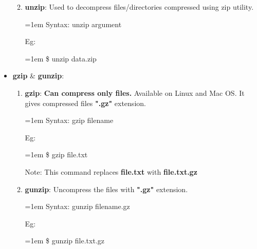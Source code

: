 \begin{flushleft}
\begin{itemize}
\begin{enumerate}
\begin{itemize}
			\end{itemize}
			
			\bigskip\bigskip
			\item \textbf{unzip}: Used to decompress files/directories compressed using zip utility.
			\begin{tcolorbox}[breakable,notitle,boxrule=0pt,colback=pink,colframe=pink]
				\color{black}
				\fontdimen2\font=1em
				Syntax: unzip argument
				\fontdimen2\font=4pt
			\end{tcolorbox}
			Eg:
			\begin{tcolorbox}[breakable,notitle,boxrule=-0pt,colback=black,colframe=black]
				\color{green}
				\fontdimen2\font=1em
				\$ unzip data.zip
				\fontdimen2\font=4pt
			\end{tcolorbox}
			
		\end{enumerate}
	

		\item \textbf{gzip} \& \textbf{gunzip}:
		\begin{enumerate}
			\item \textbf{gzip}: \textbf{Can compress only files.} Available on Linux and Mac OS. It gives compressed files \textbf{".gz"} extension.
			\begin{tcolorbox}[breakable,notitle,boxrule=0pt,colback=pink,colframe=pink]
				\color{black}
				\fontdimen2\font=1em
				Syntax: gzip filename
				\fontdimen2\font=4pt
			\end{tcolorbox}
			Eg:
			\begin{tcolorbox}[breakable,notitle,boxrule=-0pt,colback=black,colframe=black]
				\color{green}
				\fontdimen2\font=1em
				\$ gzip file.txt
				\fontdimen2\font=4pt
			\end{tcolorbox}
			
			\begin{tcolorbox}[breakable,notitle,boxrule=0pt,colback=yellow,colframe=yellow]
				\color{black}
				Note: This command replaces \textbf{file.txt} with \textbf{file.txt.gz}
			\end{tcolorbox}
			
			\bigskip
			\bigskip
			\item \textbf{gunzip}: Uncompress the files with \textbf{".gz"} extension.
			\begin{tcolorbox}[breakable,notitle,boxrule=0pt,colback=pink,colframe=pink]
				\color{black}
				\font=1em
				Syntax: gunzip filename.gz
				\font=4pt
			\end{tcolorbox}
			Eg:
			\begin{tcolorbox}[breakable,notitle,boxrule=-0pt,colback=black,colframe=black]
				\color{green}
				\font=1em
				\$ gunzip file.txt.gz
				\font=4pt
			\end{tcolorbox}		
		\end{enumerate}
		

\end{itemize}
\end{flushleft}

